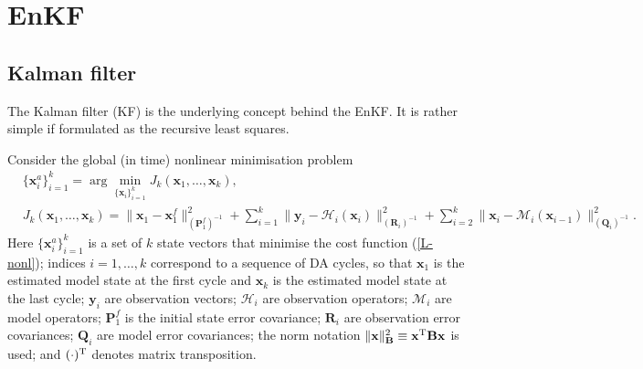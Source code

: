 \documentclass[11pt]{report}
\newcommand{\mb} {\mathbf}
\newcommand{\T}{^{\tiny \mathrm T}}
\begin{document}
\chapter{EnKF}
\label{ch:enkf}

\section{Kalman filter}

The Kalman filter (KF) is the underlying concept behind the EnKF.
It is rather simple if formulated as the recursive least squares.

Consider the global (in time) nonlinear minimisation problem
\begin{align}
  \label{min-nonl}
  &\{\mb x_i^a\}_{i=1}^k = \arg \underset{\{\mb x_i\}_{i = 1}^k}\min J_k(\mb x_1, \dots, \mb x_k),\\
  &J_k(\mb x_1, \dots, \mb x_k)  = \|\mb x_1 - \mb x_1^f\|^2_{(\mb P_1^f)^{-1}}
  + \sum_{i = 1}^k \|\mb y_i - \mathcal H_i(\mb x_i)\|^2_{(\mb R_i)^{-1}}
  + \sum_{i = 2}^k \|\mb x_i - \mathcal M_i(\mb x_{i-1})\|^2_{(\mb Q_i)^{-1}}.
  \label{L-nonl}
\end{align}
Here $\{\mb x_i^a\}_{i=1}^k$ is a set of $k$ state vectors that minimise the cost function (\ref{L-nonl}); indices $i = 1,\dots,k$ correspond to a sequence of DA cycles, so that $\mb x_1$ is the estimated model state at the first cycle and $\mb x_k$ is the estimated model state at the last cycle; $\mb y_i$ are observation vectors; $\mathcal H_i$ are observation operators; $\mathcal M_i$ are model operators; $\mb P_1^f$ is the initial state error covariance; $\mb R_i$ are observation error covariances; $\mb Q_i$ are model error covariances; the norm notation $\|\mb x\|^2_{\mb B} \equiv \mb x\T \mb B \mb x$ is used; and $(\cdot)\T$ denotes matrix transposition.
\end{document}
